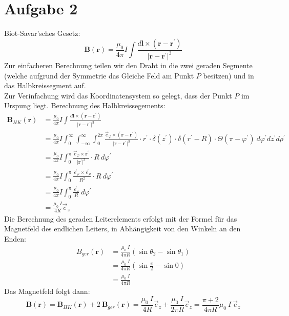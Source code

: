 \documentclass[11pt a4paper]{article}
\begin{document}
\thispagestyle{fancy}
\section*{Aufgabe 2}
Biot-Savar'sches Gesetz:
\[
	\mathbf B(\mathbf r) = \frac{\mu_0}{4\pi} I \int \frac
	{d\mathbf l \times (\mathbf r - \mathbf{r^\prime})}
	{\vert \mathbf r - \mathbf{r^\prime}\vert^3}
\]
Zur einfacheren Berechnung teilen wir den Draht in die zwei geraden 
Segmente (welche aufgrund der Symmetrie das Gleiche Feld am Punkt $P$ 
besitzen) und in das Halbkreissegment auf. \\
Zur Verinfachung wird das Koordinatensystem so gelegt, dass der Punkt 
$P$ im Urspung liegt. 
\newline
Berechnung des Halbkreissegements:
\begin{align*}
	\mathbf B_{HK}(\mathbf r) 
	&= \frac{\mu_0}{4\pi} I \int \frac
	{d\mathbf l \times (\mathbf r - \mathbf{r^\prime})}
	{\vert \mathbf r - \mathbf{r^\prime}\vert^3} \\
	&= \frac{\mu_0}{4\pi} I
	\int_0^\infty \int_{-\infty}^\infty \int_0^{2\pi}
	\frac
	{\vec e_\varphi \times (\mathbf r - \mathbf{r^\prime})}
	{\vert \mathbf r - \mathbf{r^\prime}\vert^3}
	\cdot r^\prime \cdot
	\delta(z^\prime) \cdot \delta(r^\prime - R) \cdot 
	\Theta(\pi - \varphi^\prime)
	\ d\varphi^\prime dz^\prime d\rho^\prime \\
	&= \frac{\mu_0}{4\pi} I
	\int_0^{\pi}
	\frac
	{\vec e_\varphi \times \mathbf{r^\prime}}
	{\vert \mathbf{r^\prime}\vert^3} \cdot R
	\ d\varphi^\prime \\
	&= \frac{\mu_0}{4\pi} I
	\int_0^{\pi} \frac
	{\vec e_\varphi \times \vec e_\rho}
	{R^2}
	\cdot R
	\ d\varphi^\prime \\
	&= \frac{\mu_0}{4\pi} I
	\int_0^{\pi} \frac
	{\vec e_z}
	{R}
	\ d\varphi^\prime \\
	&= \frac{\mu_0 \ I}{4R} \vec e_z
\end{align*}
Die Berechnung des geraden Leiterelements erfolgt mit der Formel für das
Magnetfeld des endlichen Leiters, in Abhängigkeit von den  Winkeln an den 
Enden:
\begin{align*}
	B_{ger} (\mathbf r)
	&= \frac{\mu_0 \ I}{4 \pi R} 
	(\sin \theta_2 - \sin \theta_1) \\
	&= \frac{\mu_0 \ I}{4 \pi R} 
	\left( \sin \frac\pi2 - \sin 0 \right) \\
	&= \frac{\mu_0 \ I}{4\pi R}
\end{align*}
Das Magnetfeld folgt dann:
\[
	\mathbf B(\mathbf r) = \mathbf B_{HK}(\mathbf r) +
	2 \ \mathbf B_{ger} (\mathbf r)
	= \frac{\mu_0 \ I}{4R} \vec e_z + \frac{\mu_0 \ I}{2\pi R} \vec e_z
	= \frac{\pi + 2}{4\pi R} \mu_0 \ I \ \vec e_z
	\]
\end{document}
